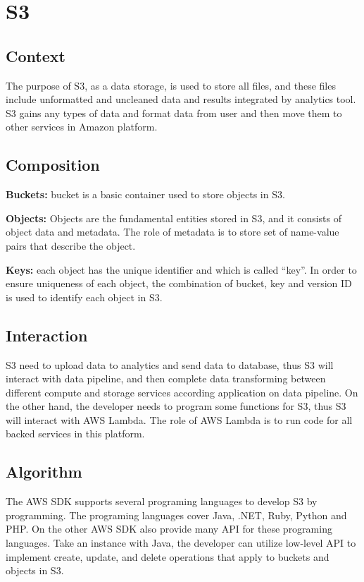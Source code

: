 \section{S3}
	\subsection{Context}
	The purpose of S3, as a data storage, is used to store all files, and these files include unformatted and uncleaned data and results integrated by analytics tool. S3 gains any types of data and format data from user and then move them to other services in Amazon platform.
        
	\subsection{Composition}
	\textbf{Buckets:} bucket is a basic container used to store objects in S3\cite{z1}.
     
    \noindent \textbf{Objects:} Objects are the fundamental entities stored in S3, and it consists of object data and metadata. The role of metadata is to store set of name-value pairs that describe the object\cite{z1}.
        
	\noindent \textbf{Keys:} each object has the unique identifier and which is called “key”. In order to ensure uniqueness of each object, the combination of bucket, key and version ID is used to identify each object in S3\cite{z1}.
    
	\subsection{Interaction}
    S3 need to upload data to analytics and send data to database, thus S3 will interact with data pipeline, and then complete data transforming between different compute and storage services according application on data pipeline. On the other hand, the developer needs to program some functions for S3, thus S3 will interact with AWS Lambda. The role of AWS Lambda is to run code for all backed services in this platform.
    
	\subsection{Algorithm}
    The AWS SDK supports several programing languages to develop S3 by programming. The programing languages cover Java, .NET, Ruby, Python and PHP. On the other AWS SDK also provide many API for these programing languages. Take an instance with Java, the developer can utilize low-level API to implement create, update, and delete operations that apply to buckets and objects in S3\cite{z2}. 
   
